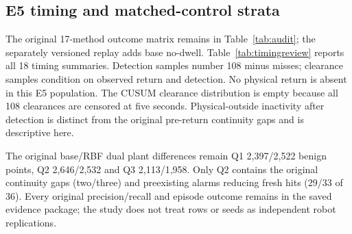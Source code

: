 \subsection{E5 timing and matched-control strata}
The original 17-method outcome matrix remains in Table~\ref{tab:audit}; the separately versioned replay adds base no-dwell. Table~\ref{tab:timingreview} reports all 18 timing summaries. Detection samples number 108 minus misses; clearance samples condition on observed return and detection. No physical return is absent in this E5 population. The CUSUM clearance distribution is empty because all 108 clearances are censored at five seconds. Physical-outside inactivity after detection is distinct from the original pre-return continuity gaps and is descriptive here.

\begin{table}[t]\centering\setlength{\tabcolsep}{4pt}
\caption{Exposed E5 timing, all methods. Values are seconds; med./p95 are conditional delay summaries. Already off counts alarms inactive at physical return. Outside inactive counts samples above tolerance after detection; each sample is 0.02 s. Missing detections remain in the misses column.}\label{tab:timingreview}

\end{table}
\begin{table}[t]\centering\setlength{\tabcolsep}{4pt}
\caption{Matched base/RBF no-dwell strata (B/R). Each plant or task has 29,700 benign observations and 36 events; each attack family has 27 events and no wholly benign episode. All strata have complete overlap/fresh coverage, no absent return and no observed outside-tolerance inactivity for these two methods. Detection/clearance p95 values are seconds.}\label{tab:stratareview}

\end{table}

The original base/RBF dual plant differences remain Q1 2,397/2,522 benign points, Q2 2,646/2,532 and Q3 2,113/1,958. Only Q2 contains the original continuity gaps (two/three) and preexisting alarms reducing fresh hits (29/33 of 36). Every original precision/recall and episode outcome remains in the saved evidence package; the study does not treat rows or seeds as independent robot replications.

